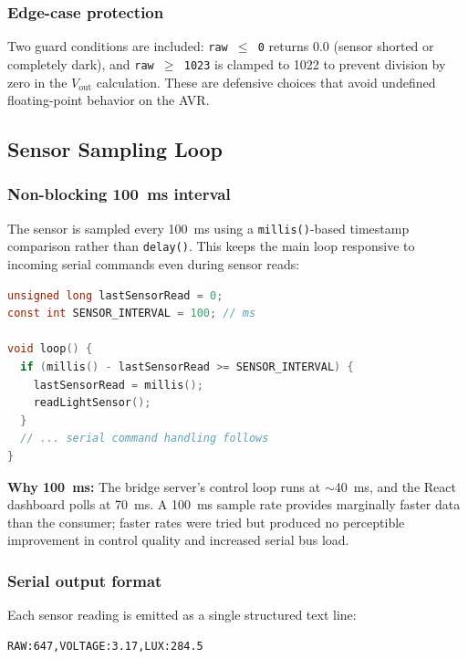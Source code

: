 \documentclass[12pt,letterpaper]{article}
\begin{document}
\subsubsection{Edge-case protection}

Two guard conditions are included: \texttt{raw~$\leq$~0} returns 0.0 (sensor
shorted or completely dark), and \texttt{raw~$\geq$~1023} is clamped to 1022
to prevent division by zero in the $V_{\mathrm{out}}$ calculation. These are
defensive choices that avoid undefined floating-point behavior on the AVR.

\subsection{Sensor Sampling Loop}

\subsubsection{Non-blocking 100~ms interval}

The sensor is sampled every 100~ms using a \texttt{millis()}-based timestamp
comparison rather than \texttt{delay()}. This keeps the main loop responsive to
incoming serial commands even during sensor reads:

\begin{lstlisting}[language=C, caption={Non-blocking sensor sampling}]
unsigned long lastSensorRead = 0;
const int SENSOR_INTERVAL = 100; // ms

void loop() {
  if (millis() - lastSensorRead >= SENSOR_INTERVAL) {
    lastSensorRead = millis();
    readLightSensor();
  }
  // ... serial command handling follows
}
\end{lstlisting}

\textbf{Why 100~ms:} The bridge server's control loop runs at $\sim$40~ms, and
the React dashboard polls at 70~ms. A 100~ms sample rate provides marginally
faster data than the consumer; faster rates were tried but produced no
perceptible improvement in control quality and increased serial bus load.

\subsubsection{Serial output format}

Each sensor reading is emitted as a single structured text line:

\begin{verbatim}
RAW:647,VOLTAGE:3.17,LUX:284.5
\end{verbatim}
\end{document}

